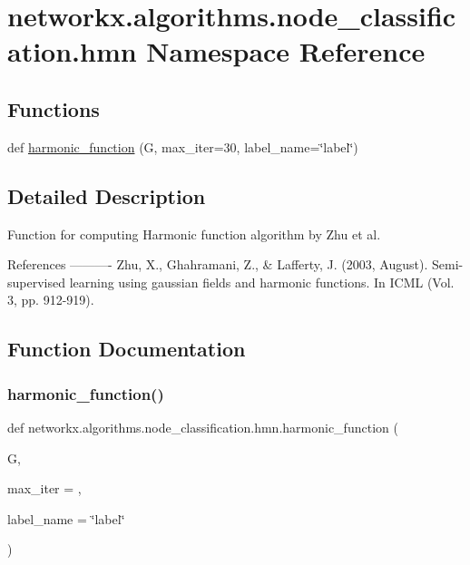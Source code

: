 \hypertarget{namespacenetworkx_1_1algorithms_1_1node__classification_1_1hmn}{}\section{networkx.\+algorithms.\+node\+\_\+classification.\+hmn Namespace Reference}
\label{namespacenetworkx_1_1algorithms_1_1node__classification_1_1hmn}
\subsection*{Functions}
\begin{DoxyCompactItemize}
\item 
def \hyperlink{namespacenetworkx_1_1algorithms_1_1node__classification_1_1hmn_afcf4ba79332b6aa9a268612b3aae6fce}{harmonic\+\_\+function} (G, max\+\_\+iter=30, label\+\_\+name=\char`\"{}label\char`\"{})
\end{DoxyCompactItemize}


\subsection{Detailed Description}
\begin{DoxyVerb}Function for computing Harmonic function algorithm by Zhu et al.

References
----------
Zhu, X., Ghahramani, Z., & Lafferty, J. (2003, August).
Semi-supervised learning using gaussian fields and harmonic functions.
In ICML (Vol. 3, pp. 912-919).
\end{DoxyVerb}
 

\subsection{Function Documentation}
\mbox{\label{namespacenetworkx_1_1algorithms_1_1node__classification_1_1hmn_afcf4ba79332b6aa9a268612b3aae6fce}} 
\subsubsection{\texorpdfstring{harmonic\+\_\+function()}{harmonic\_function()}}
{\footnotesize\ttfamily def networkx.\+algorithms.\+node\+\_\+classification.\+hmn.\+harmonic\+\_\+function (\begin{DoxyParamCaption}\item[{}]{G,  }\item[{}]{max\+\_\+iter = {},  }\item[{}]{label\+\_\+name = {\ttfamily \char`\"{}label\char`\"{}} }\end{DoxyParamCaption})}

